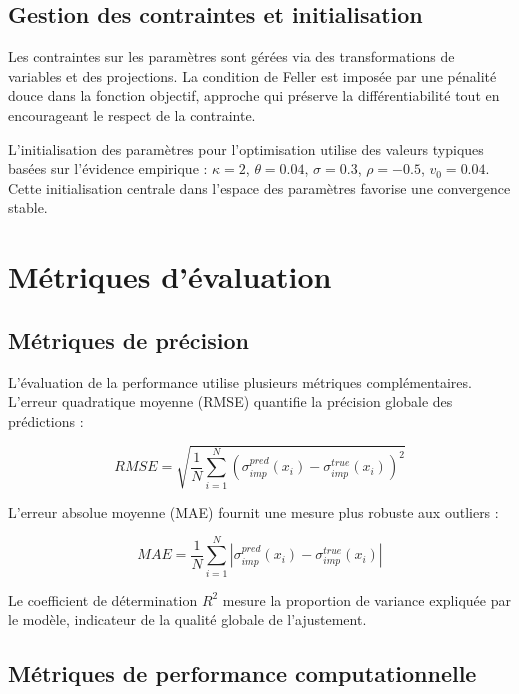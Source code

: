 \subsection{Gestion des contraintes et initialisation}

Les contraintes sur les paramètres sont gérées via des transformations de variables et des projections. La condition de Feller est imposée par une pénalité douce dans la fonction objectif, approche qui préserve la différentiabilité tout en encourageant le respect de la contrainte.

L'initialisation des paramètres pour l'optimisation utilise des valeurs typiques basées sur l'évidence empirique : $\kappa = 2$, $\theta = 0.04$, $\sigma = 0.3$, $\rho = -0.5$, $v_0 = 0.04$. Cette initialisation centrale dans l'espace des paramètres favorise une convergence stable.

\section{Métriques d'évaluation}

\subsection{Métriques de précision}

L'évaluation de la performance utilise plusieurs métriques complémentaires. L'erreur quadratique moyenne (RMSE) quantifie la précision globale des prédictions :

\begin{equation}
RMSE = \sqrt{\frac{1}{N}\sum_{i=1}^{N} (\sigma_{imp}^{pred}(x_i) - \sigma_{imp}^{true}(x_i))^2}
\end{equation}

L'erreur absolue moyenne (MAE) fournit une mesure plus robuste aux outliers :

\begin{equation}
MAE = \frac{1}{N}\sum_{i=1}^{N} |\sigma_{imp}^{pred}(x_i) - \sigma_{imp}^{true}(x_i)|
\end{equation}

Le coefficient de détermination $R^2$ mesure la proportion de variance expliquée par le modèle, indicateur de la qualité globale de l'ajustement.

\subsection{Métriques de performance computationnelle}

